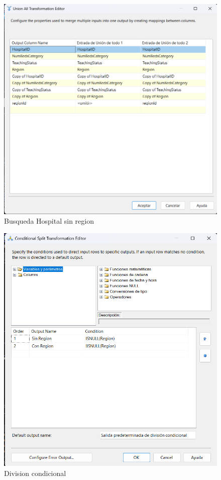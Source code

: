 \documentclass{article}
\begin{document}
	\begin{figure}[H]
		\centering
		\includegraphics[width=.7\linewidth]{./images/tutorial/union_hospital_con_o_sin_region.png}
		\caption{Busqueda Hospital sin region}
	\end{figure}
	\begin{figure}[H]
		\centering
		\includegraphics[width=.7\linewidth]{./images/tutorial/division_condicional_hospital_region_null.png}
		\caption{Division condicional}
	\end{figure}
\end{document}
